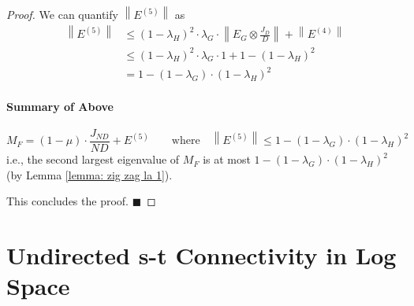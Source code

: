 \documentclass[11pt, letter]{book}
\newcommand{\qed}{\hfill $\blacksquare$}
\newcommand{\norm}[1]{\left\lVert#1\right\rVert}
\begin{document}
\begin{proof}
	We can quantify $\norm{E^{(5)}}$ as 
	\begin{align}
		\norm{E^{(5)}}
		& \leq ( 1- \lambda_H)^2 \cdot \lambda_G \cdot \norm{E_G \otimes \frac{J_D}{D}} + \norm{ E^{(4)}} \\
		& \leq ( 1- \lambda_H)^2 \cdot \lambda_G \cdot 1 + 1 - (1 - \lambda_H) ^2 \\
		& = {1 - (1 - \lambda_G) \cdot (1 - \lambda_H) ^ 2}
	\end{align}
	
	\begin{mdframed}
		\paragraph{Summary of Above}
		\begin{equation}
			M_F = (1 - \mu) \cdot \frac{J_{ND}}{ND} + E^{(5)} \quad\quad \text{where} \quad \norm{E^{(5)}} \leq 1 - (1 - \lambda_G) \cdot (1 - \lambda_H) ^ 2
		\end{equation}
		i.e., the second largest eigenvalue of $M_F$ is at most $1 - (1 - \lambda_G) \cdot (1 - \lambda_H) ^ 2$ (by Lemma \ref{lemma: zig zag la 1}). 
	\end{mdframed}
	
	This concludes the proof. \qed
\end{proof}


\section{Undirected s-t Connectivity in Log Space}
\end{document}
